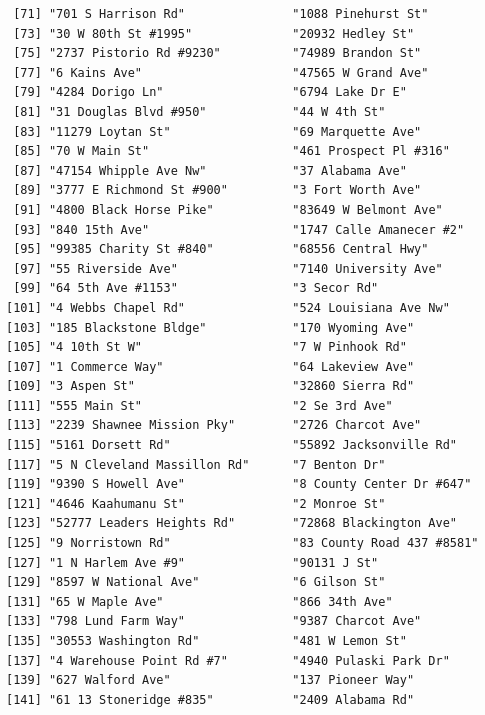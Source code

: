 \documentclass[
  12pt,
]{article}
\begin{document}
\begin{verbatim}
 [71] "701 S Harrison Rd"               "1088 Pinehurst St"              
 [73] "30 W 80th St #1995"              "20932 Hedley St"                
 [75] "2737 Pistorio Rd #9230"          "74989 Brandon St"               
 [77] "6 Kains Ave"                     "47565 W Grand Ave"              
 [79] "4284 Dorigo Ln"                  "6794 Lake Dr E"                 
 [81] "31 Douglas Blvd #950"            "44 W 4th St"                    
 [83] "11279 Loytan St"                 "69 Marquette Ave"               
 [85] "70 W Main St"                    "461 Prospect Pl #316"           
 [87] "47154 Whipple Ave Nw"            "37 Alabama Ave"                 
 [89] "3777 E Richmond St #900"         "3 Fort Worth Ave"               
 [91] "4800 Black Horse Pike"           "83649 W Belmont Ave"            
 [93] "840 15th Ave"                    "1747 Calle Amanecer #2"         
 [95] "99385 Charity St #840"           "68556 Central Hwy"              
 [97] "55 Riverside Ave"                "7140 University Ave"            
 [99] "64 5th Ave #1153"                "3 Secor Rd"                     
[101] "4 Webbs Chapel Rd"               "524 Louisiana Ave Nw"           
[103] "185 Blackstone Bldge"            "170 Wyoming Ave"                
[105] "4 10th St W"                     "7 W Pinhook Rd"                 
[107] "1 Commerce Way"                  "64 Lakeview Ave"                
[109] "3 Aspen St"                      "32860 Sierra Rd"                
[111] "555 Main St"                     "2 Se 3rd Ave"                   
[113] "2239 Shawnee Mission Pky"        "2726 Charcot Ave"               
[115] "5161 Dorsett Rd"                 "55892 Jacksonville Rd"          
[117] "5 N Cleveland Massillon Rd"      "7 Benton Dr"                    
[119] "9390 S Howell Ave"               "8 County Center Dr #647"        
[121] "4646 Kaahumanu St"               "2 Monroe St"                    
[123] "52777 Leaders Heights Rd"        "72868 Blackington Ave"          
[125] "9 Norristown Rd"                 "83 County Road 437 #8581"       
[127] "1 N Harlem Ave #9"               "90131 J St"                     
[129] "8597 W National Ave"             "6 Gilson St"                    
[131] "65 W Maple Ave"                  "866 34th Ave"                   
[133] "798 Lund Farm Way"               "9387 Charcot Ave"               
[135] "30553 Washington Rd"             "481 W Lemon St"                 
[137] "4 Warehouse Point Rd #7"         "4940 Pulaski Park Dr"           
[139] "627 Walford Ave"                 "137 Pioneer Way"                
[141] "61 13 Stoneridge #835"           "2409 Alabama Rd"                

\end{verbatim}
\end{document}
